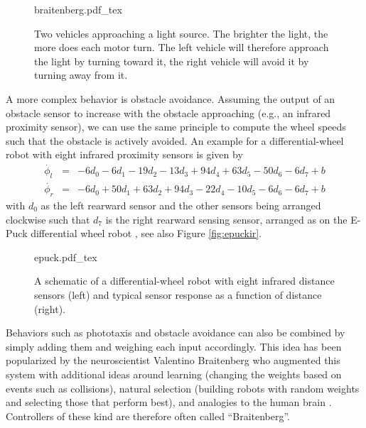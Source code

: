 \begin{figure}
    \centering
    \def\svgwidth{0.7\textwidth}
    {braitenberg.pdf_tex}
    \caption{Two vehicles approaching a light source. The brighter the light, the more does each motor turn. The left vehicle will therefore approach the light by turning toward it, the right vehicle will avoid it by turning away from it.\label{fig:braitenberg}}
\end{figure}

A more complex behavior is obstacle avoidance. Assuming the output of an obstacle sensor to increase with the obstacle approaching (e.g., an infrared proximity sensor), we can use the same principle to compute the wheel speeds such that the obstacle is actively avoided. An example for a differential-wheel robot with eight infrared proximity sensors is given by
\begin{eqnarray}
\nonumber
\dot{\phi_l}&=&-6d_0-6d_1-19d_2-13d_3+94d_4+63d_5-50d_6-6d_7+b\\
\nonumber
\dot{\phi_r}&=&-6d_0+50d_1+63d_2+94d_3-22d_4-10d_5-6d_6-6d_7+b
\end{eqnarray}
%
%
with $d_0$ as the left rearward sensor and the other sensors being arranged clockwise such that $d_7$ is the right rearward sensing sensor, arranged as on the E-Puck differential wheel robot \cite{mondada2009puck}, see also Figure \ref{fig:epuckir}.

\begin{figure}
\centering
    \def\svgwidth{\textwidth}
    {epuck.pdf_tex}
    \caption{A schematic of a differential-wheel robot with eight infrared distance sensors (left) and typical sensor response as a function of distance (right).}
\end{figure}

Behaviors such as phototaxis and obstacle avoidance can also be combined by simply adding them and weighing each input accordingly. This idea has been popularized by the neuroscientist Valentino Braitenberg who augmented this system with additional ideas around learning (changing the weights based on events such as collisions), natural selection (building robots with random weights and selecting those that perform best), and analogies to the human brain \cite{braitenberg1986vehicles}. Controllers of these kind are therefore often called ``Braitenberg''.

